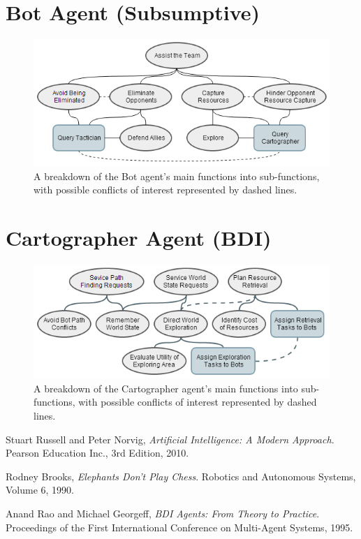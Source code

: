 \documentclass[a4paper,10pt]{article}
\begin{document}
\section{Bot Agent (Subsumptive)}
\begin{figure}[ht]
  \centering
  \includegraphics[width=0.7\linewidth]{bot}
  \begin{minipage}[t]{0.8\textwidth}
    \caption{A breakdown of the Bot agent's main functions into sub-functions, with possible conflicts of interest represented by dashed lines.}
  \end{minipage}
\end{figure}

\section{Cartographer Agent (BDI)}
\begin{figure}[ht]
  \centering
  \includegraphics[width=0.7\linewidth]{cartographer}
  \begin{minipage}[t]{0.8\textwidth}
    \caption{A breakdown of the Cartographer agent's main functions into sub-functions, with possible conflicts of interest represented by dashed lines.}
  \end{minipage}
\end{figure}


\begin{thebibliography}{9}
    Stuart Russell and Peter Norvig,
    \emph{Artificial Intelligence: A Modern Approach}. \newline
    Pearson Education Inc.,
    3rd Edition,
    2010.

    Rodney Brooks,
    \emph{Elephants Don't Play Chess}. \newline
    Robotics and Autonomous Systems,
    Volume 6,
    1990.

    Anand Rao and Michael Georgeff,
    \emph{BDI Agents: From Theory to Practice}. \newline
    Proceedings of the First International Conference on Multi-Agent Systems,
    1995.
\end{thebibliography}
\end{document}
